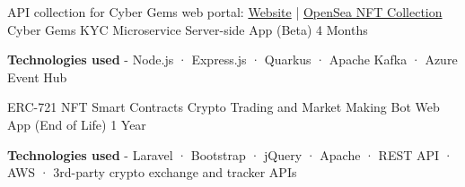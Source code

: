 \begin{cventries}
{\begin{cvitems}
      \end{cvitems}
    }
  \cventry
    {API collection for Cyber Gems web portal: \hyperlink{https://cybergems.com/}{Website} | \hyperlink{https://opensea.io/collection/cybergems-io}{OpenSea NFT Collection}} %
    {Cyber Gems KYC Microservice} %
    {Server-side App (Beta)} %
    {4 Months} %
    {
      \begin{cvitems} %
        \item {\textbf{Technologies used} \hspace{0.03cm} - \hspace{0.03cm} Node.js \hspace{0.03cm} · \hspace{0.03cm} Express.js \hspace{0.03cm} · \hspace{0.03cm} Quarkus \hspace{0.03cm} · \hspace{0.03cm} Apache Kafka \hspace{0.03cm} · \hspace{0.03cm} Azure Event Hub \\}
      \end{cvitems}
    }
  \cventry
    {ERC-721 NFT Smart Contracts} %
    {Crypto Trading and Market Making Bot} %
    {Web App (End of Life)} %
    {1 Year} %
    {
      \begin{cvitems} %
        \item {\textbf{Technologies used} \hspace{0.03cm} - \hspace{0.03cm} Laravel \hspace{0.03cm} · \hspace{0.03cm} Bootstrap \hspace{0.03cm} · \hspace{0.03cm} jQuery \hspace{0.03cm} · \hspace{0.03cm} Apache \hspace{0.03cm} · \hspace{0.03cm} REST API \hspace{0.03cm} · \hspace{0.03cm} AWS \hspace{0.03cm} · \hspace{0.03cm} 3rd-party crypto exchange and tracker APIs \\}
      \end{cvitems}
    }
\end{cventries}
